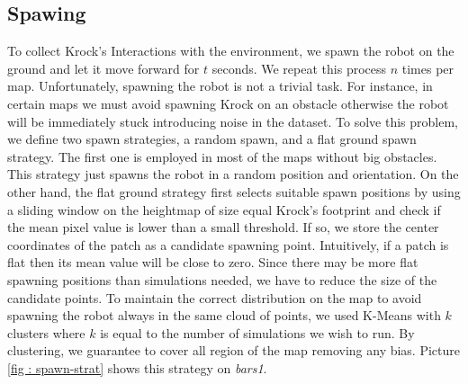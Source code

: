 \documentclass[../document.tex]{subfiles}
\begin{document}
\subsection{Spawing}
To collect Krock's Interactions with the environment, we spawn the robot on the ground and let it move forward for $t$ seconds. We repeat this process $n$ times per map.
    Unfortunately, spawning the robot is not a trivial task. For instance, in certain maps we must avoid spawning Krock on an obstacle otherwise the robot will be immediately stuck introducing noise in the dataset. To solve this problem, we define two spawn strategies, a random spawn, and a flat ground spawn strategy. The first one is employed in most of the maps without big obstacles. This strategy just spawns the robot in a random position and orientation. 
    On the other hand, the flat ground strategy first selects suitable spawn positions by using a sliding window on the heightmap of size equal Krock's footprint and check if the mean pixel value is lower than a small threshold. If so, we store the center coordinates of the patch as a candidate spawning point. Intuitively, if a patch is flat then its mean value will be close to zero.
Since there may be more flat spawning positions than simulations needed, we have to reduce the size of the candidate points. To maintain the correct distribution on the map to avoid spawning the robot always in the same cloud of points, we used K-Means with $k$ clusters where $k$ is equal to the number of simulations we wish to run. By clustering, we guarantee to cover all region of the map removing any bias. Picture \ref{fig : spawn-strat} shows this strategy on \emph{bars1}. 
\end{document}
